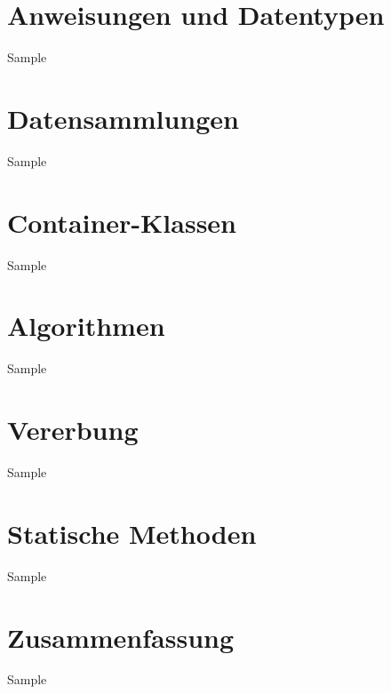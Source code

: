\documentclass{hswbeamer}
\begin{document}



\section{Anweisungen und Datentypen}
\begin{frame}{Sample}
\end{frame}

\section{Datensammlungen}
\begin{frame}{Sample}
\end{frame}

\section{Container-Klassen}
\begin{frame}{Sample}
\end{frame}

\section{Algorithmen}
\begin{frame}{Sample}
\end{frame}

\section{Vererbung}
\begin{frame}{Sample}
\end{frame}

\section{Statische Methoden}
\begin{frame}{Sample}
\end{frame}

\section{Zusammenfassung}
\begin{frame}{Sample}
\end{frame}
\end{document}
